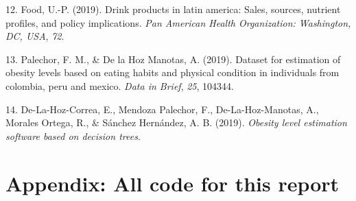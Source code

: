 \documentclass[
  letterpaper,
  DIV=11,
  numbers=noendperiod]{scrartcl}
\newlength{\cslhangindent}
\newenvironment{CSLReferences}[2] %
 {\begin{list}{}{%
  \setlength{\itemindent}{0pt}
  \setlength{\leftmargin}{0pt}
  \setlength{\parsep}{0pt}
  \ifodd #1
   \setlength{\leftmargin}{\cslhangindent}
   \setlength{\itemindent}{-1\cslhangindent}
  \fi
  \setlength{\itemsep}{#2\baselineskip}}}
 {\end{list}}
\begin{document}
\begin{CSLReferences}{1}{0}
12. Food, U.-P. (2019). Drink products in latin america: Sales, sources,
nutrient profiles, and policy implications. \emph{Pan American Health
Organization: Washington, DC, USA}, \emph{72}.

13. Palechor, F. M., \& De la Hoz Manotas, A. (2019). Dataset for
estimation of obesity levels based on eating habits and physical
condition in individuals from colombia, peru and mexico. \emph{Data in
Brief}, \emph{25}, 104344.

14. De-La-Hoz-Correa, E., Mendoza Palechor, F., De-La-Hoz-Manotas, A.,
Morales Ortega, R., \& Sánchez Hernández, A. B. (2019). \emph{Obesity
level estimation software based on decision trees}.

\end{CSLReferences}

\section{Appendix: All code for this
report}\label{appendix-all-code-for-this-report}
\end{document}
